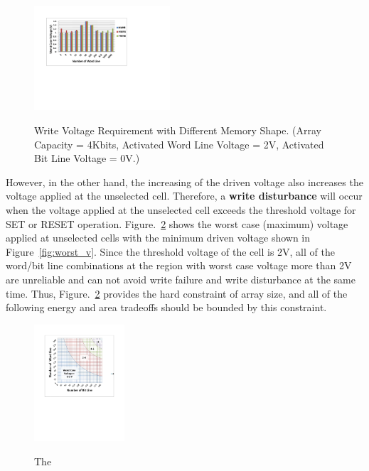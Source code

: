 \begin{figure}%
\centering
  \includegraphics[width=0.45\textwidth]{./figures/shape2.pdf}\\
  \caption{Write Voltage Requirement with Different Memory Shape. (Array Capacity = 4Kbits, Activated Word Line Voltage = 2V, Activated Bit Line Voltage = 0V.)}\label{fig:shape}
\end{figure}

However, in the other hand, the increasing of the driven voltage also
increases the voltage applied at the unselected cell. Therefore, a
\textbf{write disturbance} will occur when the voltage applied at the
unselected cell exceeds the threshold voltage for SET or RESET operation.
Figure.~\ref{fig:half} shows the worst case (maximum) voltage applied at
unselected cells with the minimum driven voltage shown in
Figure~\ref{fig:worst_v}. Since the threshold voltage of the cell is 2V,
all of the word/bit line combinations at the region with worst case
voltage more than 2V are unreliable and can not avoid write failure and
write disturbance at the same time. Thus, Figure.~\ref{fig:half} provides
the hard constraint of array size, and all of the following energy and
area tradeoffs should be bounded by this constraint.

\begin{figure}%
\centering
  \includegraphics[width=0.3\textwidth]{./figures/Theoretical_bound.pdf}\\
  \caption{The }\label{fig:half}
\end{figure}



